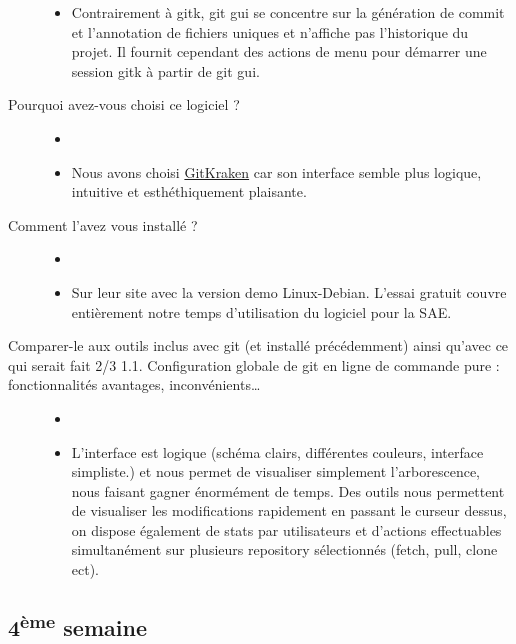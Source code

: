 \documentclass{report}
\begin{document}
\begin{description}
\begin{itemize}
\tightlist
\item
  Contrairement à gitk, git gui se concentre sur la génération de commit
  et l'annotation de fichiers uniques et n'affiche pas l'historique du
  projet. Il fournit cependant des actions de menu pour démarrer une
  session gitk à partir de git gui.
\end{itemize}
\item[Pourquoi avez-vous choisi ce logiciel ?]
\begin{itemize}
\tightlist
\item[]
\item
  Nous avons choisi \href{https://www.gitkraken.com/}{GitKraken} car son
  interface semble plus logique, intuitive et esthéthiquement plaisante.
\end{itemize}
\item[Comment l'avez vous installé ?]
\begin{itemize}
\tightlist
\item[]
\item
  Sur leur site avec la version demo Linux-Debian. L'essai gratuit
  couvre entièrement notre temps d'utilisation du logiciel pour la SAE.
\end{itemize}
\item[Comparer-le aux outils inclus avec git (et installé précédemment)
ainsi qu'avec ce qui serait fait 2/3 \textbar{} 1.1. Configuration
globale de git en ligne de commande pure : fonctionnalités avantages,
inconvénients\ldots{}]
\begin{itemize}
\tightlist
\item[]
\item
  L'interface est logique (schéma clairs, différentes couleurs,
  interface simpliste.) et nous permet de visualiser simplement
  l'arborescence, nous faisant gagner énormément de temps. Des outils
  nous permettent de visualiser les modifications rapidement en passant
  le curseur dessus, on dispose également de stats par utilisateurs et
  d'actions effectuables simultanément sur plusieurs repository
  sélectionnés (fetch, pull, clone ect).
\end{itemize}
\end{description}

\subsection{\texorpdfstring{4\textsuperscript{ème}
semaine}{4ème semaine}}\label{4S}
\end{document}
